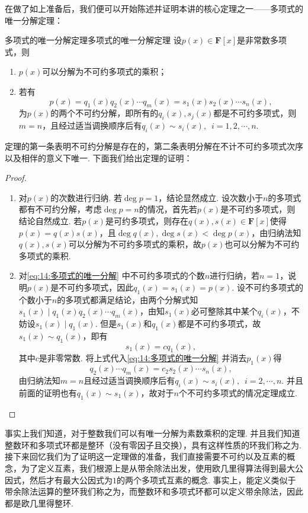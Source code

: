在做了如上准备后，我们便可以开始陈述并证明本讲的核心定理之一——多项式的唯一分解定理：
\begin{theorem}{多项式的唯一分解定理}{多项式的唯一分解定理}
    设$p(x)\in\mathbf{F}[x]$是非常数多项式，则
    \begin{enumerate}
        \item $p(x)$可以分解为不可约多项式的乘积；
        \item 若有
              \begin{equation} \label{eq:14:多项式的唯一分解}
                  p(x)=q_1(x)q_2(x)\cdots q_m(x)=s_1(x)s_2(x)\cdots s_n(x),
              \end{equation}
              为$p(x)$的两个不可约分解，即所有的$q_i(x),s_j(x)$都是不可约多项式，则$m=n$，且经过适当调换顺序后有$q_i(x)\sim s_i(x),\enspace i=1,2,\cdots,n$.
    \end{enumerate}
\end{theorem}
定理的第一条表明不可约分解是存在的，第二条表明分解在不计不可约多项式次序以及相伴的意义下唯一. 下面我们给出定理的证明：
\begin{proof}
    \begin{enumerate}
        \item 对$p(x)$的次数进行归纳. 若$\deg p=1$，结论显然成立. 设次数小于$n$的多项式都有不可约分解，考虑$\deg p=n$的情况，首先若$p(x)$是不可约多项式，则结论自然成立. 若$p(x)$是可约多项式，则存在$q(x),s(x)\in\mathbf{F}[x]$使得$p(x)=q(x)s(x)$，且$\deg q(x),\deg s(x)<\deg p(x)$，由归纳法知$q(x),s(x)$可以分解为不可约多项式的乘积，故$p(x)$也可以分解为不可约多项式的乘积.
        \item 对\autoref{eq:14:多项式的唯一分解} 中不可约多项式的个数$n$进行归纳，若$n=1$，说明$p(x)$是不可约多项式，因此$q_1(x)=s_1(x)=p(x)$. 设不可约多项式的个数小于$n$的多项式都满足结论，由两个分解式知$s_1(x)\mid q_1(x)q_2(x)\cdots q_m(x)$，由知$s_1(x)$必可整除其中某个$q_i(x)$，不妨设$s_1(x)\mid q_1(x)$. 但是$s_1(x)$和$q_1(x)$都是不可约多项式，故$s_1(x)\sim q_1(x)$，即有
              \[s_1(x)=cq_1(x),\]
              其中$c$是非零常数. 将上式代入\autoref{eq:14:多项式的唯一分解} 并消去$p_1(x)$得
              \[q_2(x)\cdots q_m(x)=c_2s_2(x)\cdots s_n(x),\]
              由归纳法知$m=n$且经过适当调换顺序后有$q_i(x)\sim s_i(x),\enspace i=2,\cdots,n$. 并且前面的证明也有$q_1(x)\sim s_1(x)$，故对于$n$个不可约多项式的情况定理成立.
    \end{enumerate}
\end{proof}

事实上我们知道，对于整数我们可以有唯一分解为素数乘积的定理. 并且我们知道整数环和多项式环都是整环（没有零因子且交换），具有这样性质的环我们称之为. 接下来回忆我们为了证明这一定理做的准备，我们直接需要不可约以及互素的概念，为了定义互素，我们根源上是从带余除法出发，使用欧几里得算法得到最大公因式，然后才有最大公因式为$1$的两个多项式互素的概念. 事实上，能定义类似于带余除法运算的整环我们称之为，而整数环和多项式环都可以定义带余除法，因此都是欧几里得整环.


